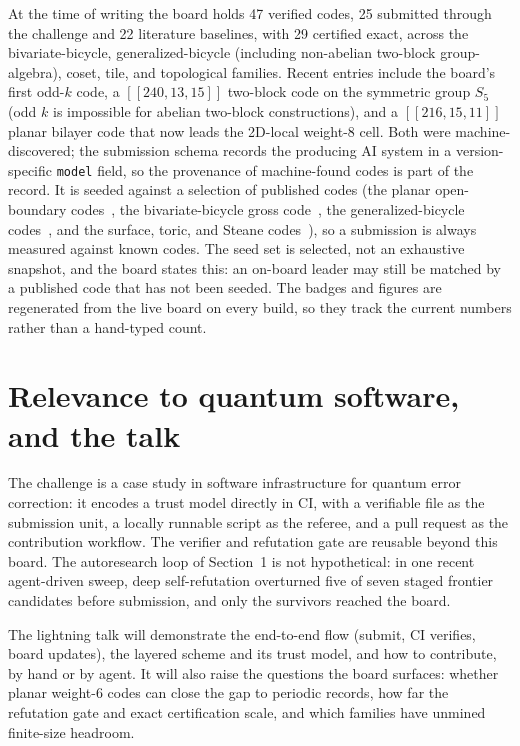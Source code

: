 \documentclass[11pt]{article}
\begin{document}
At the time of writing the board holds 47 verified codes, 25 submitted through
the challenge and 22 literature baselines, with 29 certified exact, across the
bivariate-bicycle, generalized-bicycle (including non-abelian two-block
group-algebra), coset, tile, and topological families. Recent entries include the board's first odd-$k$ code, a
$[[240,13,15]]$ two-block code on the symmetric group $S_5$ (odd $k$ is
impossible for abelian two-block constructions), and a $[[216,15,11]]$ planar
bilayer code that now leads the 2D-local weight-8 cell. Both were
machine-discovered; the submission schema records the producing AI system in a
version-specific \texttt{model} field, so the provenance of machine-found codes
is part of the record. It is seeded against a selection of published codes (the
planar open-boundary codes~\cite{liang2025planar}, the bivariate-bicycle gross
code~\cite{bravyi2024high}, the generalized-bicycle
codes~\cite{panteleev2021degenerate,wang2022distance,lin2024quantum}, and the
surface, toric, and Steane codes~\cite{kitaev2003fault,steane1996error}), so a
submission is always measured against known codes. The seed set is selected, not
an exhaustive snapshot, and the board states this: an on-board leader may still
be matched by a published
code that has not been seeded. The badges and figures are regenerated from the
live board on every build, so they track the current numbers rather than a
hand-typed count.

\section{Relevance to quantum software, and the talk}

The challenge is a case study in software infrastructure for quantum error
correction: it encodes a trust model directly in CI, with a verifiable file as
the submission unit, a locally runnable script as the referee, and a pull
request as the contribution workflow. The verifier and refutation gate are
reusable beyond this board. The autoresearch loop of Section~1 is not
hypothetical: in one recent agent-driven sweep, deep self-refutation overturned
five of seven staged frontier candidates before submission, and only the
survivors reached the board.

The lightning talk will demonstrate the end-to-end flow (submit, CI verifies,
board updates), the layered scheme and its trust model, and how to contribute,
by hand or by agent. It will also raise the questions the
board surfaces: whether planar weight-6 codes can close the gap to periodic
records, how far the refutation gate and exact certification scale, and which
families have unmined finite-size headroom.

{\footnotesize


}
\end{document}
